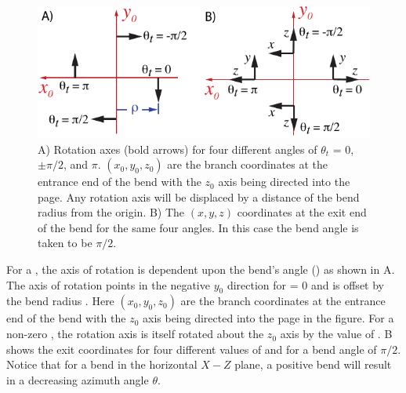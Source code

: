 
\begin{figure}
\centering \includegraphics{tilt-bend.pdf} 
\caption[Orientation of a Bend.] 
  {
A) Rotation axes (bold arrows) for four different  angles of $\theta_t$ = 0, $\pm
\pi/2$, and $\pi$. $(x_0, y_0, z_0)$ are the branch coordinates at the entrance end of the bend with
the $z_0$ axis being directed into the page. Any rotation axis will be displaced by a distance of
the bend radius  from the origin. B) The $(x, y, z)$ coordinates at the exit end of the bend
for the same four  angles. In this case the bend angle is taken to be $\pi/2$.
  }
  \label{f:tilt.bend}
\end{figure}


For a , the axis of rotation is dependent upon the bend's  angle
() as shown in A. The axis of rotation points in the negative $y_0$
direction for  = 0 and is offset by the bend radius . Here $(x_0, y_0, z_0)$
are the branch coordinates at the entrance end of the bend with the $z_0$ axis being directed into
the page in the figure.  For a non-zero , the rotation axis is itself rotated about the
$z_0$ axis by the value of . B shows the exit coordinates for four
different values of  and for a bend angle  of $\pi/2$.  Notice that for a
bend in the horizontal $X-Z$ plane, a positive bend  will result in a decreasing azimuth
angle $\theta$.

